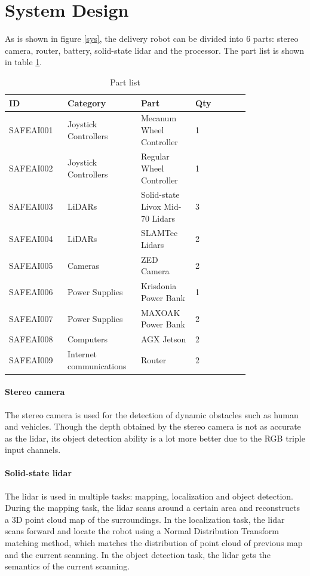 \documentclass[balance,upint,subscriptcorrection,varvw,nofoot, mathalfa=cal=boondoxo,spanish,french,vietnamese,russian,greek,pdf-a,fontspec,colorlinks]{asmeconf}
\begin{document}
\section{System Design}
As is shown in figure \ref{sys}, the delivery robot can be divided into 6 parts: stereo camera, router, battery, solid-state lidar and the processor. The part list is shown in table \ref{parts}.
\begin{table}[!ht]
    \centering
    \begin{tabular}{p{0.2\linewidth} p{0.2\linewidth} p{0.2\linewidth} p{0.2\linewidth}}
    \hline
        ID & Category & Part & Qty \\ \hline
        SAFEAI001 & Joystick Controllers & Mecanum Wheel Controller & 1 \\ 
        SAFEAI002 & Joystick Controllers & Regular Wheel Controller & 1 \\ 
        SAFEAI003 & LiDARs & Solid-state Livox Mid-70 Lidars & 3 \\ 
        SAFEAI004 & LiDARs & SLAMTec Lidars & 2 \\ 
        SAFEAI005 & Cameras & ZED Camera & 2 \\ 
        SAFEAI006 & Power Supplies & Krisdonia Power Bank & 1 \\ 
        SAFEAI007 & Power Supplies & MAXOAK Power Bank & 2 \\ 
        SAFEAI008 & Computers & AGX Jetson & 2 \\ 
        SAFEAI009 & Internet communications & Router & 2 \\ \hline
    \end{tabular}
	\caption{Part list}\label{parts}
\end{table}


\paragraph{Stereo camera} The stereo camera is used for the detection of dynamic obstacles such as human and vehicles. Though the depth obtained by the stereo camera is not as accurate as the lidar, its object detection ability is a lot more better due to the RGB triple input channels.
\paragraph{Solid-state lidar} The lidar is used in multiple tasks: mapping, localization and object detection. During the mapping task, the lidar scans around a certain area and reconstructs a 3D point cloud map of the surroundings. In the localization task, the lidar scans forward and locate the robot using a Normal Distribution Transform matching method, which matches the distribution of point cloud of previous map and the current scanning. In the object detection task, the lidar gets the semantics of the current scanning.
\end{document}
